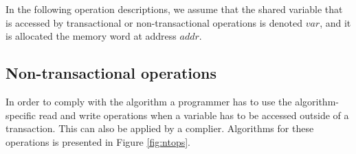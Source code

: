 \documentclass[11pt,letterpaper]{article}
\begin{document}
In the following operation descriptions, we assume that the shared variable
that  is   accessed  by  transactional or  non-transactional operations  is
denoted $\mathit{var}$, and   
it is allocated the memory word at address $\mathit{addr}$.



\subsection{Non-transactional operations}
In  order  to  comply  with  the  algorithm a  programmer  has  to  use  the
algorithm-specific   read  and write  operations when a  variable has  to be
accessed outside of a transaction.  This can also be applied by a complier.
Algorithms for these operations is presented in Figure \ref{fig:ntops}. 
\end{document}
